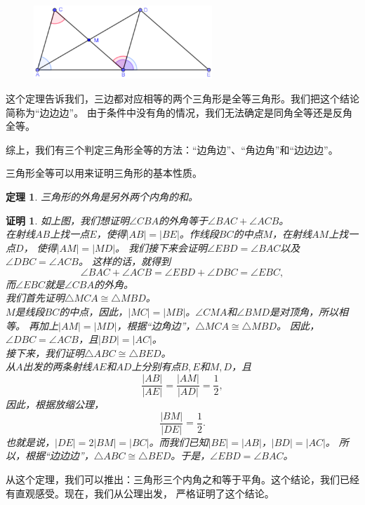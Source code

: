 \documentclass[12pt,UTF8]{ctexbook}
\newtheorem{tm}{定理}[section]
\newtheorem*{proof2}{证明}
\begin{document}
\begin{figure} %
    \vspace{-10pt}
    \centering
    \includegraphics[width=0.6\textwidth]{三角形5.png}
\end{figure}

这个定理告诉我们，三边都对应相等的两个三角形是全等三角形。我们把这个结论简称为“边边边”。
由于条件中没有角的情况，我们无法确定是同角全等还是反角全等。

综上，我们有三个判定三角形全等的方法：“边角边”、“角边角”和“边边边”。

三角形全等可以用来证明三角形的基本性质。

\begin{tm}\label{tm:3-0-5}
    三角形的外角是另外两个内角的和。
\end{tm}

\begin{proof2}
    如上图，我们想证明$\angle CBA$的外角等于$\angle BAC + \angle ACB$。\\
    在射线$AB$上找一点$E$，使得$|AB| = |BE|$。作线段$BC$的中点$M$，在射线$AM$上找一点$D$，
    使得$|AM| = |MD|$。
    我们接下来会证明$\angle EBD = \angle BAC$以及$\angle DBC = \angle ACB$。
    这样的话，就得到
    $$\angle BAC + \angle ACB = \angle EBD + \angle DBC = \angle EBC,$$
    而$\angle EBC$就是$\angle CBA$的外角。\\
    我们首先证明$\triangle MCA \cong \triangle MBD$。\\
    $M$是线段$BC$的中点，因此，$|MC| = |MB|$。$\angle CMA$和$\angle BMD$是对顶角，所以相等。
    再加上$|AM| = |MD|$，根据“边角边”，$\triangle MCA \cong \triangle MBD$。
    因此，$\angle DBC = \angle ACB$，且$|BD| = |AC|$。\\
    接下来，我们证明$\triangle ABC \cong \triangle BED$。\\
    从$A$出发的两条射线$AE$和$AD$上分别有点$B,E$和$M,D$，且
    $$ \frac{|AB|}{|AE|} = \frac{|AM|}{|AD|} = \frac12,$$
    因此，根据放缩公理，
    $$ \frac{|BM|}{|DE|} = \frac12.$$
    也就是说，$|DE| = 2|BM| = |BC|$。而我们已知$|BE| = |AB|$，$|BD| = |AC|$。
    所以，根据“边边边”，$\triangle ABC \cong \triangle BED$。于是，$\angle EBD = \angle BAC$。
\end{proof2}
从这个定理，我们可以推出：三角形三个内角之和等于平角。这个结论，我们已经有直观感受。现在，我们从公理出发，
严格证明了这个结论。
\end{document}
